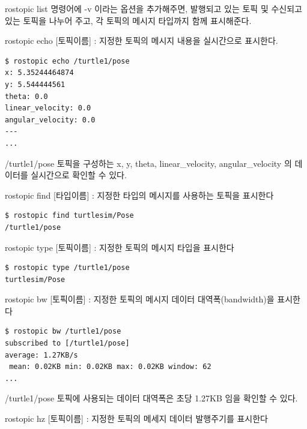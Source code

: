 \noindent
rostopic list 명령어에 -v 이라는 옵션을 추가해주면, 발행되고 있는 토픽 및 수신되고 있는 토픽을 나누어 주고, 각 토픽의 메시지 타입까지 함께 표시해준다.

\vspace{\baselineskip}
\noindent
{}\circled{\thenum} rostopic echo [토픽이름] : 지정한 토픽의 메시지 내용을 실시간으로 표시한다.

\begin{lstlisting}[language=ROS]
$ rostopic echo /turtle1/pose 
x: 5.35244464874
y: 5.544444561
theta: 0.0
linear_velocity: 0.0
angular_velocity: 0.0
---
...
\end{lstlisting}

\noindent
/turtle1/pose 토픽을 구성하는 x, y, theta, linear\_velocity, angular\_velocity 의 데이터를 실시간으로 확인할 수 있다.

\vspace{\baselineskip}
\noindent
{}\circled{\thenum} rostopic find [타입이름] : 지정한 타입의 메시지를 사용하는 토픽을 표시한다

\begin{lstlisting}[language=ROS]
$ rostopic find turtlesim/Pose
/turtle1/pose
\end{lstlisting}

\vspace{\baselineskip}
\noindent
{}\circled{\thenum} rostopic type [토픽이름] : 지정한 토픽의 메시지 타입을 표시한다

\begin{lstlisting}[language=ROS]
$ rostopic type /turtle1/pose 
turtlesim/Pose
\end{lstlisting}

\vspace{\baselineskip}
\noindent
{}\circled{\thenum} rostopic bw [토픽이름] : 지정한 토픽의 메시지 데이터 대역폭(bandwidth)을 표시한다

\begin{lstlisting}[language=ROS]
$ rostopic bw /turtle1/pose 
subscribed to [/turtle1/pose]
average: 1.27KB/s
 mean: 0.02KB min: 0.02KB max: 0.02KB window: 62
...
\end{lstlisting}

\noindent
/turtle1/pose 토픽에 사용되는 데이터 대역폭은 초당 1.27KB 임을 확인할 수 있다.

\vspace{\baselineskip}
\noindent
{}\circled{\thenum} rostopic hz [토픽이름] : 지정한 토픽의 메세지 데이터 발행주기를 표시한다

